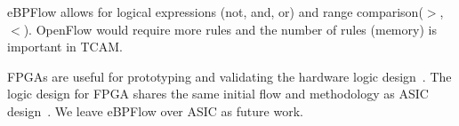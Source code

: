 %


eBPFlow allows for logical expressions (not, and, or) and range comparison($>$,$<$). OpenFlow would require more rules and the number of rules (memory) is important in TCAM. 


FPGAs are useful for prototyping and validating the hardware logic design~\cite{cofer2005rapid,sukhwani2017contutto}. 
The logic design for FPGA shares the same initial flow and methodology as ASIC design~\cite{kuon07measuring,ASICDesignFlow2005}. 
We leave eBPFlow over ASIC as future work.

